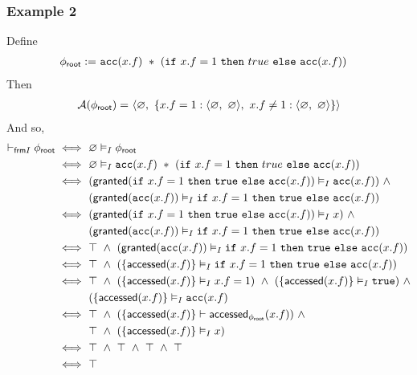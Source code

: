 \newpage
\subsubsection*{Example 2}

Define
\begin{align*}
\phiroot := & \
\cacc(x.f) \ \ast \ (\cif \ x.f = 1 \ \cthen \ true \ \celse \ \cacc(x.f))
\end{align*}
Then
\begin{align*}
\mathcal{A}({\phi_\textsf{root}}) = & \
\langle \varnothing ,\ \left\{  x.f = 1 : \langle \varnothing ,\ \varnothing \rangle ,\ x.f \neq 1: \langle \varnothing ,\ \varnothing \rangle  \right\} \rangle \\
\end{align*}
And so,
\begin{align*}
\selfframing \phiroot
\iff & \
\empty \frames \phiroot
\\ \iff & \
\empty \frames \cacc(x.f) \ \ast \ (\cif \ x.f = 1 \ \cthen \ true \ \celse \ \cacc(x.f))
\\ \iff & \
( \granted(\cif \ x.f = 1 \ \cthen \ \ctrue \ \celse \ \cacc(x.f)) \frames \cacc(x.f) ) \ \land \\ & \
( \granted(\cacc(x.f)) \frames \cif \ x.f = 1 \ \cthen \ \ctrue \ \celse \ \cacc(x.f) )
\\ \iff & \
( \granted(\cif \ x.f = 1 \ \cthen \ \ctrue \ \celse \ \cacc(x.f)) \frames x ) \ \land \\ & \
( \granted(\cacc(x.f)) \frames \cif \ x.f = 1 \ \cthen \ \ctrue \ \celse \ \cacc(x.f) )
\\ \iff & \
\top \ \land \ ( \granted(\cacc(x.f)) \frames \cif \ x.f = 1 \ \cthen \ \ctrue \ \celse \ \cacc(x.f) )
\\ \iff & \
\top \ \land \ ( \set{ \accessed(x.f) } \frames \cif \ x.f = 1 \ \cthen \ \ctrue \ \celse \ \cacc(x.f) )
\\ \iff & \
\top \ \land \
( \set{ \accessed(x.f) } \frames x.f = 1 ) \ \land \
( \set{ \accessed(x.f) } \frames \ctrue ) \ \land \\ & \
( \set{ \accessed(x.f) } \frames \cacc(x.f)
\\ \iff & \
\top \ \land \
( \set{ \accessed(x.f) } \entails \accessed_{\phiroot}(x.f) ) \ \land \\ & \
\top \ \land \
( \set{ \accessed(x.f) } \frames x )
\\ \iff & \
\top \ \land \
\top \ \land \
\top \ \land \
\top
\\ \iff & \
\top
\end{align*}

